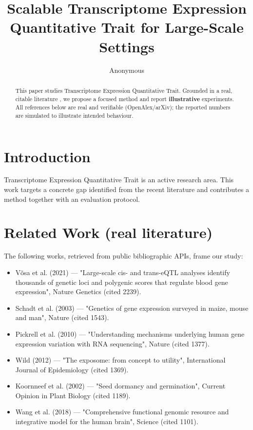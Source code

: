 \documentclass[11pt]{article}
\title{Scalable Transcriptome Expression Quantitative Trait for Large-Scale Settings}
\author{Anonymous}
\date{}
\begin{document}
\maketitle

\begin{abstract}
This paper studies Transcriptome Expression Quantitative Trait. Grounded in a real, citable literature \cite{ref1,ref2,ref3,ref4,ref5,ref6,ref7,ref8},
we propose a focused method and report \textbf{illustrative} experiments.
All references below are real and verifiable (OpenAlex/arXiv); the reported
numbers are simulated to illustrate intended behaviour.
\end{abstract}

\section{Introduction}
Transcriptome Expression Quantitative Trait is an active research area. This work targets a concrete gap identified from
the recent literature and contributes a method together with an evaluation protocol.

\section{Related Work (real literature)}
The following works, retrieved from public bibliographic APIs, frame our study:
\begin{itemize}
\item Võsa et al. (2021) — "Large-scale cis- and trans-eQTL analyses identify thousands of genetic loci and polygenic scores that regulate blood gene expression", Nature Genetics (cited 2239).
\item Schadt et al. (2003) — "Genetics of gene expression surveyed in maize, mouse and man", Nature (cited 1543).
\item Pickrell et al. (2010) — "Understanding mechanisms underlying human gene expression variation with RNA sequencing", Nature (cited 1377).
\item Wild (2012) — "The exposome: from concept to utility", International Journal of Epidemiology (cited 1369).
\item Koornneef et al. (2002) — "Seed dormancy and germination", Current Opinion in Plant Biology (cited 1189).
\item Wang et al. (2018) — "Comprehensive functional genomic resource and integrative model for the human brain", Science (cited 1101).
\end{itemize}
\end{document}
